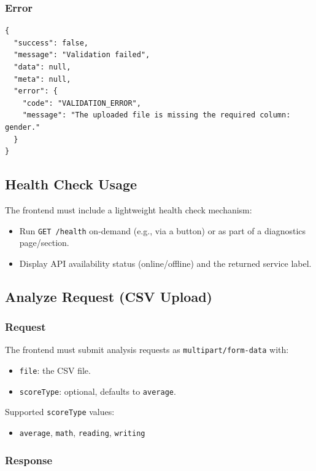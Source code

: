 \documentclass[12pt,a4paper]{article}
\begin{document}
\subsubsection{Error}
\begin{lstlisting}
{
  "success": false,
  "message": "Validation failed",
  "data": null,
  "meta": null,
  "error": {
    "code": "VALIDATION_ERROR",
    "message": "The uploaded file is missing the required column: gender."
  }
}
\end{lstlisting}

\subsection{Health Check Usage}

The frontend must include a lightweight health check mechanism:
\begin{itemize}
    \item Run \texttt{GET /health} on-demand (e.g., via a button) or as part of a diagnostics page/section.
    \item Display API availability status (online/offline) and the returned service label.
\end{itemize}

\subsection{Analyze Request (CSV Upload)}

\subsubsection{Request}

The frontend must submit analysis requests as \texttt{multipart/form-data} with:
\begin{itemize}
    \item \texttt{file}: the CSV file.
    \item \texttt{scoreType}: optional, defaults to \texttt{average}.
\end{itemize}

Supported \texttt{scoreType} values:
\begin{itemize}
    \item \texttt{average}, \texttt{math}, \texttt{reading}, \texttt{writing}
\end{itemize}

\subsubsection{Response}
\end{document}
